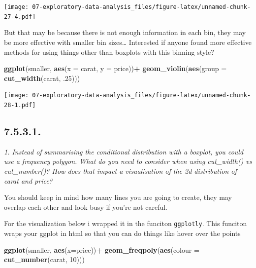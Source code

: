 \documentclass[]{book}
\newenvironment{Shaded}{\begin{snugshade}}{\end{snugshade}}
\newcommand{\DataTypeTok}[1]{\textcolor[rgb]{0.13,0.29,0.53}{#1}}
\newcommand{\DecValTok}[1]{\textcolor[rgb]{0.00,0.00,0.81}{#1}}
\newcommand{\FloatTok}[1]{\textcolor[rgb]{0.00,0.00,0.81}{#1}}
\newcommand{\KeywordTok}[1]{\textcolor[rgb]{0.13,0.29,0.53}{\textbf{#1}}}
\newcommand{\NormalTok}[1]{#1}
\newcommand{\OperatorTok}[1]{\textcolor[rgb]{0.81,0.36,0.00}{\textbf{#1}}}
\newcommand{\StringTok}[1]{\textcolor[rgb]{0.31,0.60,0.02}{#1}}
\theoremstyle{definition}
\theoremstyle{definition}
\theoremstyle{definition}
\theoremstyle{remark}
\begin{document}
\texttt{[image: 07-exploratory-data-analysis\_files/figure-latex/unnamed-chunk-27-4.pdf]}

But that may be because there is not enough information in each bin,
they may be more effective with smaller bin sizes\ldots{} Interested if
anyone found more effective methods for using things other than boxplots
with this binning style?

\begin{Shaded}
\begin{Highlighting}[]
\KeywordTok{ggplot}\NormalTok{(smaller, }\KeywordTok{aes}\NormalTok{(}\DataTypeTok{x =}\NormalTok{ carat, }\DataTypeTok{y =}\NormalTok{ price))}\OperatorTok{+}
\StringTok{  }\KeywordTok{geom_violin}\NormalTok{(}\KeywordTok{aes}\NormalTok{(}\DataTypeTok{group =} \KeywordTok{cut_width}\NormalTok{(carat, }\FloatTok{.25}\NormalTok{)))}
\end{Highlighting}
\end{Shaded}

\texttt{[image: 07-exploratory-data-analysis\_files/figure-latex/unnamed-chunk-28-1.pdf]}

\hypertarget{section-25}{%
\subsection{7.5.3.1.}\label{section-25}}

\emph{1. Instead of summarising the conditional distribution with a
boxplot, you could use a frequency polygon. What do you need to consider
when using cut\_width() vs cut\_number()? How does that impact a
visualisation of the 2d distribution of carat and price?}

You should keep in mind how many lines you are going to create, they may
overlap each other and look busy if you're not careful.

For the visualization below i wrapped it in the funciton
\texttt{ggplotly}. This funciton wraps your ggplot in html so that you
can do things like hover over the points

\begin{Shaded}
\begin{Highlighting}[]
\KeywordTok{ggplot}\NormalTok{(smaller, }\KeywordTok{aes}\NormalTok{(}\DataTypeTok{x=}\NormalTok{price))}\OperatorTok{+}
\StringTok{  }\KeywordTok{geom_freqpoly}\NormalTok{(}\KeywordTok{aes}\NormalTok{(}\DataTypeTok{colour =} \KeywordTok{cut_number}\NormalTok{(carat, }\DecValTok{10}\NormalTok{)))}
\end{Highlighting}
\end{Shaded}
\end{document}
